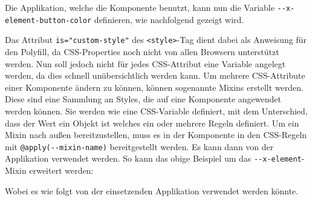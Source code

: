 Die Applikation, welche die Komponente benutzt, kann nun die Variable
\texttt{-\/-x-element-button-color} definieren, wie nachfolgend gezeigt
wird.

\begin{Shaded}
\begin{Highlighting}[]
\KeywordTok{>}
  \KeywordTok{\{}
     \KeywordTok{;}
  \KeywordTok{\}}
\end{Highlighting}
\end{Shaded}

Das Attribut \texttt{is="custom-style"} des
\texttt{\textless{}style\textgreater{}}-Tag dient dabei als Anweisung
für den Polyfill, da CSS-Properties noch nicht von allen Browsern
unterstützt werden. Nun soll jedoch nicht für jedes CSS-Attribut eine
Variable angelegt werden, da dies schnell unübersichtlich werden kann.
Um mehrere CSS-Attribute einer Komponente ändern zu können, können
sogenannte Mixins erstellt werden. Diese sind eine Sammlung an Styles,
die auf eine Komponente angewendet werden können. Sie werden wie eine
CSS-Variable definiert, mit dem Unterschied, dass der Wert ein Objekt
ist welches ein oder mehrere Regeln definiert. Um ein Mixin nach außen
bereitzustellen, muss es in der Komponente in den CSS-Regeln mit
\texttt{@apply(-\/-mixin-name)} bereitgestellt werden. Es kann dann von
der Applikation verwendet werden. So kann das obige Beispiel um das
\texttt{-\/-x-element}-Mixin erweitert werden:

\begin{Shaded}
\begin{Highlighting}[]
\KeywordTok{>}
       \KeywordTok{\{}
         \NormalTok{)}\KeywordTok{;}
      \KeywordTok{\}}
\end{Highlighting}
\end{Shaded}

Wobei es wie folgt von der einsetzenden Applikation verwendet werden
könnte.

\begin{Shaded}
\begin{Highlighting}[]
\KeywordTok{>}
  \KeywordTok{\{}
     \KeywordTok{;}
     \NormalTok{\{}
        \DataTypeTok{10px}\KeywordTok{;}
         \DataTypeTok{10px}\KeywordTok{;}
    \KeywordTok{\}}\NormalTok{;}
  \NormalTok{\}}
\end{Highlighting}
\end{Shaded}

